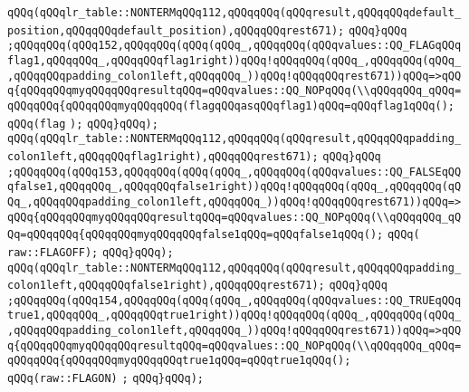 \verb|qQQq(qQQqlr_table::NONTERMqQQq112,qQQqqQQq(qQQqresult,qQQqqQQqdefault_position,qQQqqQQqdefault_position),qQQqqQQqrest671);|\newline
\verb|qQQq}qQQq|\newline
\verb|;qQQqqQQq(qQQq152,qQQqqQQq(qQQq(qQQq_,qQQqqQQq(qQQqvalues::QQ_FLAGqQQqflag1,qQQqqQQq_,qQQqqQQqflag1right))qQQq!qQQqqQQq(qQQq_,qQQqqQQq(qQQq_,qQQqqQQqpadding_colon1left,qQQqqQQq_))qQQq!qQQqqQQqrest671))qQQq=>qQQq{qQQqqQQqmyqQQqqQQqresultqQQq=qQQqvalues::QQ_NOPqQQq(\\qQQqqQQq_qQQq=qQQqqQQq{qQQqqQQqmyqQQqqQQq(flagqQQqasqQQqflag1)qQQq=qQQqflag1qQQq();|\newline
\verb|qQQq(flag|\newline
\verb|);|\newline
\verb|qQQq}qQQq);|\newline
\verb|qQQq(qQQqlr_table::NONTERMqQQq112,qQQqqQQq(qQQqresult,qQQqqQQqpadding_colon1left,qQQqqQQqflag1right),qQQqqQQqrest671);|\newline
\verb|qQQq}qQQq|\newline
\verb|;qQQqqQQq(qQQq153,qQQqqQQq(qQQq(qQQq_,qQQqqQQq(qQQqvalues::QQ_FALSEqQQqfalse1,qQQqqQQq_,qQQqqQQqfalse1right))qQQq!qQQqqQQq(qQQq_,qQQqqQQq(qQQq_,qQQqqQQqpadding_colon1left,qQQqqQQq_))qQQq!qQQqqQQqrest671))qQQq=>qQQq{qQQqqQQqmyqQQqqQQqresultqQQq=qQQqvalues::QQ_NOPqQQq(\\qQQqqQQq_qQQq=qQQqqQQq{qQQqqQQqmyqQQqqQQqfalse1qQQq=qQQqfalse1qQQq();|\newline
\verb|qQQq(|\newline
\verb|raw::FLAGOFF);|\newline
\verb|qQQq}qQQq);|\newline
\verb|qQQq(qQQqlr_table::NONTERMqQQq112,qQQqqQQq(qQQqresult,qQQqqQQqpadding_colon1left,qQQqqQQqfalse1right),qQQqqQQqrest671);|\newline
\verb|qQQq}qQQq|\newline
\verb|;qQQqqQQq(qQQq154,qQQqqQQq(qQQq(qQQq_,qQQqqQQq(qQQqvalues::QQ_TRUEqQQqtrue1,qQQqqQQq_,qQQqqQQqtrue1right))qQQq!qQQqqQQq(qQQq_,qQQqqQQq(qQQq_,qQQqqQQqpadding_colon1left,qQQqqQQq_))qQQq!qQQqqQQqrest671))qQQq=>qQQq{qQQqqQQqmyqQQqqQQqresultqQQq=qQQqvalues::QQ_NOPqQQq(\\qQQqqQQq_qQQq=qQQqqQQq{qQQqqQQqmyqQQqqQQqtrue1qQQq=qQQqtrue1qQQq();|\newline
\verb|qQQq(raw::FLAGON)|\newline
\verb|;|\newline
\verb|qQQq}qQQq);|\newline
